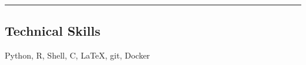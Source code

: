 \documentclass[10pt,a4paper]{article}
\newenvironment{indentsection}[1]%
{\begin{list}{}%
	{\setlength{\leftmargin}{#1}}%
	\item[]%
}
{\end{list}}
\newcommand{\CPP}
{C\nolinebreak[4]\hspace{-.05em}\raisebox{.22ex}{\footnotesize\bf ++}}
\begin{document}
\nocite{*} %

\printbibliography[heading=none]




\hrule
\vspace{-1em}
\subsection*{Technical Skills}

\begin{indentsection}{\parindent}
\begin{description*}
	\item {Python, R, Shell, \CPP, \LaTeX, git, Docker}


\end{description*}



\end{indentsection}






\end{document}
